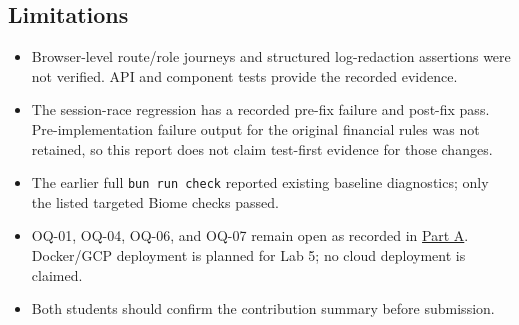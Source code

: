 \documentclass[10pt,a4paper]{article}
\renewcommand{\arraystretch}{1.08}
\newcommand{\PartLink}[2]{\hyperref[part:#1:start]{#2}}
\begin{document}
\normalsize
\setlength{\tabcolsep}{6pt}
\renewcommand{\arraystretch}{1.15}

\subsection{Limitations}
\begin{itemize}
  \item Browser-level route/role journeys and structured log-redaction assertions were not verified. API and component tests provide the recorded evidence.
  \item The session-race regression has a recorded pre-fix failure and post-fix pass. Pre-implementation failure output for the original financial rules was not retained, so this report does not claim test-first evidence for those changes.
  \item The earlier full \texttt{bun run check} reported existing baseline diagnostics; only the listed targeted Biome checks passed.
  \item OQ-01, OQ-04, OQ-06, and OQ-07 remain open as recorded in \PartLink{A}{Part A}. Docker/GCP deployment is planned for Lab 5; no cloud deployment is claimed.
  \item Both students should confirm the contribution summary before submission.
\end{itemize}

\label{part:F:end}
\end{document}
